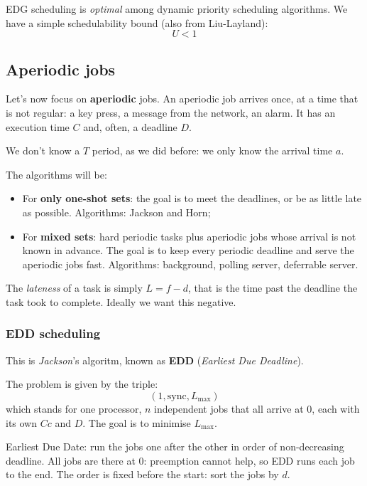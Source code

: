\documentclass[a4paper,11pt]{article}
\begin{document}
\par\smallskip

EDG scheduling is \textit{optimal} among dynamic priority scheduling algorithms.
We have a simple schedulability bound (also from Liu-Layland):
$$
	U < 1
$$

\subsection{Aperiodic jobs}

Let's now focus on \textbf{aperiodic} jobs.
An aperiodic job arrives once, at a time that is not regular: a key press, a message from the network, an alarm. It has an execution time $C$ and, often, a deadline $D$.

We don't know a $T$ period, as we did before: we only know the arrival time $a$.

The algorithms will be:
\begin{itemize}
	\item For \textbf{only one-shot sets}: the goal is to meet the deadlines, or be as little late as possible. Algorithms: Jackson and Horn;
	\item For \textbf{mixed sets}: hard periodic tasks plus aperiodic jobs whose arrival is not known in advance. The goal is to keep every periodic deadline and serve the aperiodic jobs fast. Algorithms: background, polling server, deferrable server.
\end{itemize}

The \textit{lateness} of a task is simply $L = f - d$, that is the time past the deadline the task took to complete. Ideally we want this negative.

\subsubsection{EDD scheduling}

This is \textit{Jackson}'s algoritm, known as \textbf{EDD} (\textit{Earliest Due Deadline}).

The problem is given by the triple:
$$
	(1, \text{sync}, L_\text{max})
$$
which stands for one processor, $n$ independent jobs that all arrive at 0, each with its own $Cc$ and $D$. The goal is to minimise $L_\text{max}$.

Earliest Due Date: run the jobs one after the other in order of non-decreasing deadline.
All jobs are there at 0: preemption cannot help, so EDD runs each job to the end.
The order is fixed before the start: sort the jobs by $d$.
\end{document}
